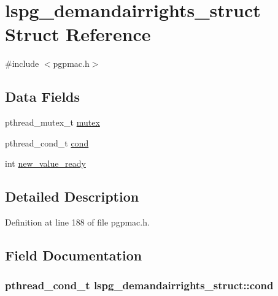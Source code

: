 \hypertarget{structlspg__demandairrights__struct}{\section{lspg\-\_\-demandairrights\-\_\-struct Struct Reference}
\label{structlspg__demandairrights__struct}
}


{\ttfamily \#include $<$pgpmac.\-h$>$}

\subsection*{Data Fields}
\begin{DoxyCompactItemize}
\item 
pthread\-\_\-mutex\-\_\-t \hyperlink{structlspg__demandairrights__struct_a874970af767d4bb329f9764075b30096}{mutex}
\item 
pthread\-\_\-cond\-\_\-t \hyperlink{structlspg__demandairrights__struct_addc1e3476a3f282a19b335f7875861d1}{cond}
\item 
int \hyperlink{structlspg__demandairrights__struct_ad686c9a04d0c7e10b236c234eaf03ce7}{new\-\_\-value\-\_\-ready}
\end{DoxyCompactItemize}


\subsection{Detailed Description}


Definition at line 188 of file pgpmac.\-h.



\subsection{Field Documentation}
\hypertarget{structlspg__demandairrights__struct_addc1e3476a3f282a19b335f7875861d1}{
\subsubsection[{cond}]{\setlength{\rightskip}{0pt plus 5cm}pthread\-\_\-cond\-\_\-t lspg\-\_\-demandairrights\-\_\-struct\-::cond}}\label{structlspg__demandairrights__struct_addc1e3476a3f282a19b335f7875861d1}


